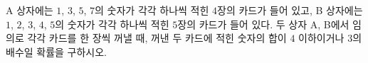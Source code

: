 A 상자에는 $1$, $3$, $5$, $7$의 숫자가 각각 하나씩 적힌 $4$장의 카드가 들어 있고, B 상자에는 $1$, $2$, $3$, $4$, $5$의 숫자가 각각 하나씩 적힌 $5$장의 카드가 들어 있다. 두 상자 A, B에서 임의로 각각 카드를 한 장씩 꺼낼 때, 꺼낸 두 카드에 적힌 숫자의 합이 $4$ 이하이거나 $3$의 배수일 확률을 구하시오.
